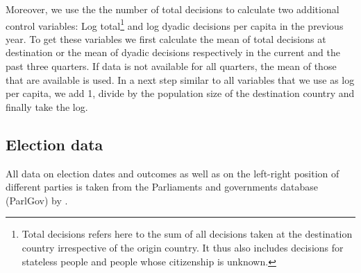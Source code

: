 \documentclass[11pt,a4paper]{scrartcl}
\begin{document}
Moreover, we use the the number of total decisions to calculate two additional control variables: Log total\footnote{Total decisions refers here to the sum of all decisions taken at the destination country irrespective of the origin country. It thus also includes decisions for stateless people and people whose citizenship is unknown.} and log dyadic decisions per capita in the previous year. To get these variables we first calculate the mean of total decisions at destination or the mean of dyadic decisions respectively in the current and the past three quarters. If data is not available for all quarters, the mean of those that are available is used. In a next step similar to all variables that we use as log per capita, we add 1, divide by the population size of the destination country and finally take the log.   

\subsection{Election data}
All data on election dates and outcomes as well as on the left-right position of different parties is taken from the Parliaments and governments database (ParlGov) by \textcite{parlgov2016}.
\end{document}
